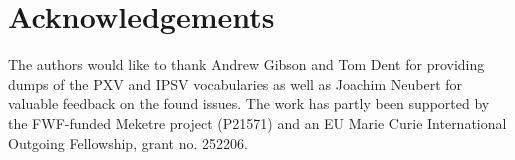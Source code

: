 \section{Acknowledgements}

The authors would like to thank Andrew Gibson and Tom Dent for providing dumps of the PXV and IPSV vocabularies as well as Joachim Neubert for valuable feedback on the found issues. The work has partly been supported by the FWF-funded Meketre project (P21571) and an EU Marie Curie International Outgoing Fellowship, grant no. 252206. 

